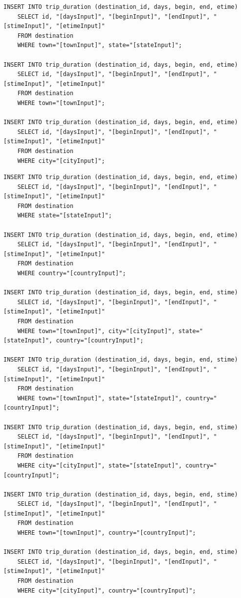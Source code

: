 \documentclass[letterpaper,10pt,onecolumn,compsoc]{IEEEtran}
\begin{document}
\begin{verbatim}
INSERT INTO trip_duration (destination_id, days, begin, end, etime) 
	SELECT id, "[daysInput]", "[beginInput]", "[endInput]", "[stimeInput]", "[etimeInput]" 
	FROM destination 
	WHERE town="[townInput]", state="[stateInput]";
	
INSERT INTO trip_duration (destination_id, days, begin, end, etime) 
	SELECT id, "[daysInput]", "[beginInput]", "[endInput]", "[stimeInput]", "[etimeInput]" 
	FROM destination 
	WHERE town="[townInput]";
	
INSERT INTO trip_duration (destination_id, days, begin, end, etime) 
	SELECT id, "[daysInput]", "[beginInput]", "[endInput]", "[stimeInput]", "[etimeInput]" 
	FROM destination 
	WHERE city="[cityInput]";
\end{verbatim}

\newpage

\begin{verbatim}
INSERT INTO trip_duration (destination_id, days, begin, end, etime) 
	SELECT id, "[daysInput]", "[beginInput]", "[endInput]", "[stimeInput]", "[etimeInput]" 
	FROM destination 
	WHERE state="[stateInput]";
	
INSERT INTO trip_duration (destination_id, days, begin, end, etime) 
	SELECT id, "[daysInput]", "[beginInput]", "[endInput]", "[stimeInput]", "[etimeInput]" 
	FROM destination 
	WHERE country="[countryInput]";
	
INSERT INTO trip_duration (destination_id, days, begin, end, stime) 
	SELECT id, "[daysInput]", "[beginInput]", "[endInput]", "[stimeInput]", "[etimeInput]" 
	FROM destination 
	WHERE town="[townInput]", city="[cityInput]", state="[stateInput]", country="[countryInput]";
	
INSERT INTO trip_duration (destination_id, days, begin, end, stime) 
	SELECT id, "[daysInput]", "[beginInput]", "[endInput]", "[stimeInput]", "[etimeInput]" 
	FROM destination 
	WHERE town="[townInput]", state="[stateInput]", country="[countryInput]";
	
INSERT INTO trip_duration (destination_id, days, begin, end, stime) 
	SELECT id, "[daysInput]", "[beginInput]", "[endInput]", "[stimeInput]", "[etimeInput]" 
	FROM destination 
	WHERE city="[cityInput]", state="[stateInput]", country="[countryInput]";
	
INSERT INTO trip_duration (destination_id, days, begin, end, stime) 
	SELECT id, "[daysInput]", "[beginInput]", "[endInput]", "[stimeInput]", "[etimeInput]" 
	FROM destination 
	WHERE town="[townInput]", country="[countryInput]";
	
INSERT INTO trip_duration (destination_id, days, begin, end, stime) 
	SELECT id, "[daysInput]", "[beginInput]", "[endInput]", "[stimeInput]", "[etimeInput]" 
	FROM destination 
	WHERE city="[cityInput]", country="[countryInput]";
	

\end{verbatim}
\end{document}
